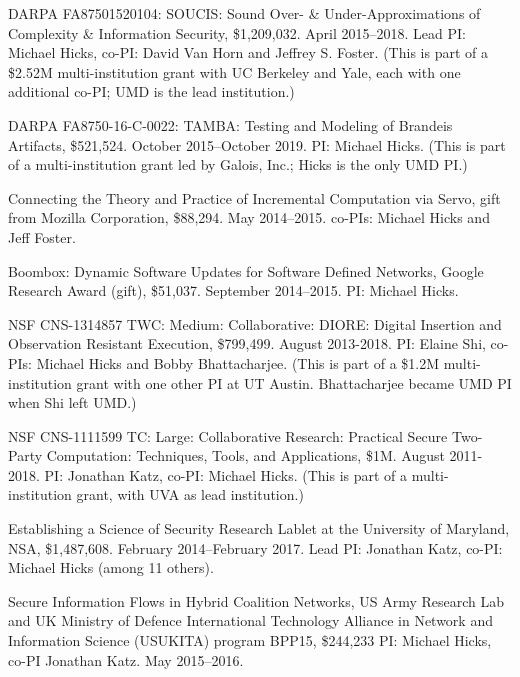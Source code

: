\documentclass[11pt]{article}
\begin{document}
\begin{description}
\item DARPA FA87501520104: SOUCIS: Sound Over- \& Under-Approximations of Complexity \& Information Security, \$1,209,032. April 2015--2018. Lead PI: Michael Hicks, co-PI: David Van Horn and Jeffrey S. Foster. (This is part of a \$2.52M multi-institution grant with UC Berkeley and Yale, each with one additional co-PI; UMD is the lead institution.)

\item DARPA FA8750-16-C-0022: TAMBA: Testing and Modeling of Brandeis Artifacts, \$521,524. October 2015--October 2019. PI: Michael Hicks. (This is part of a multi-institution grant led by Galois, Inc.; Hicks is the only UMD PI.)

\item Connecting the Theory and Practice of Incremental Computation via Servo, gift from Mozilla Corporation, \$88,294. May 2014--2015. co-PIs: Michael Hicks and Jeff Foster.

\item Boombox: Dynamic Software Updates for Software Defined Networks, Google Research Award (gift), \$51,037. September 2014--2015. PI: Michael Hicks.

\item NSF CNS-1314857 TWC: Medium: Collaborative: DIORE: Digital Insertion and Observation Resistant Execution, \$799,499. August 2013-2018. PI: Elaine Shi, co-PIs: Michael Hicks and Bobby Bhattacharjee. (This is part of a \$1.2M multi-institution grant with one other PI at UT Austin. Bhattacharjee became UMD PI when Shi left UMD.)

\item NSF CNS-1111599 TC: Large: Collaborative Research: Practical Secure Two-Party Computation: Techniques, Tools, and Applications, \$1M. August 2011-2018. PI: Jonathan Katz, co-PI: Michael Hicks. (This is part of a multi-institution grant, with UVA as lead institution.)

\item Establishing a Science of Security Research Lablet at the University of Maryland, NSA, \$1,487,608. February 2014--February 2017. Lead PI: Jonathan Katz, co-PI: Michael Hicks (among 11 others).

\item Secure Information Flows in Hybrid Coalition Networks, US Army Research Lab and UK Ministry of Defence International Technology Alliance in Network and Information Science (USUKITA) program BPP15, \$244,233 PI: Michael Hicks, co-PI Jonathan Katz. May 2015--2016.


\end{description}
\end{document}
